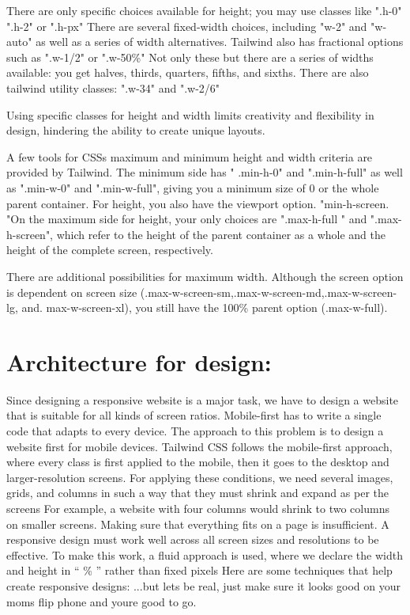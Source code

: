 \documentclass[conference]{IEEEtran}
\begin{document}
There are only specific choices available for height; you may use
classes like ".h-0" ".h-2" or ".h-px" There are several fixed-width
choices, including "w-2" and "w-auto" as well as a series of width
alternatives. Tailwind also has fractional options such as ".w-1/2" or
".w-50\%" Not only these but there are a series of widths available:
you get halves, thirds, quarters, fifths, and sixths. There are also
tailwind utility classes: ".w-34" and ".w-2/6"

Using specific classes for height and width limits creativity and
flexibility in design, hindering the ability to create unique layouts.

A few tools for CSS\textquotesingle s maximum and minimum height and
width criteria are provided by Tailwind. The minimum side has " .min-h-0" and ".min-h-full" as well as ".min-w-0" and ".min-w-full", giving you a minimum size of 0 or the whole parent container. For height, you also have the viewport option. "min-h-screen. "On the maximum side for height, your only choices are ".max-h-full " and ".max-h-screen", which refer to the height of the parent container as a whole and the height of the complete screen, respectively.

There are additional possibilities for maximum width. Although the screen option is dependent on screen size
(.max-w-screen-sm,.max-w-screen-md,.max-w-screen-lg, and.
max-w-screen-xl), you still have the 100\% parent option (.max-w-full).


\section{Architecture for design:}

Since designing a responsive website is a major task, we have to design a website that is suitable for all kinds of screen ratios. Mobile-first has to write a single code that adapts to every device. The approach to this problem is to design a website first for mobile devices. Tailwind CSS follows the mobile-first approach, where every class is first applied to the mobile, then it goes to the desktop and larger-resolution screens. For applying these conditions, we need several images, grids, and columns in such a way that they must shrink and expand as per the screens For example, a website with four columns would shrink to two columns on smaller screens. Making sure that everything fits on a page is insufficient. A responsive design must work well across all screen sizes and resolutions to be effective. To make this work, a fluid approach is used, where we declare the width and height in `` \% '' rather than fixed pixels Here are some techniques that help create responsive designs: ...but let\textquotesingle s be real, just make sure it looks good on your mom\textquotesingle s flip phone and you\textquotesingle re good to go.
\end{document}
